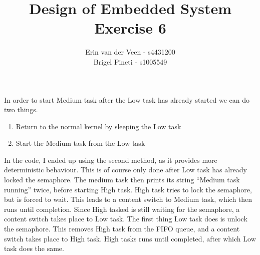 \documentclass{scrartcl}
\title{Design of Embedded System\\Exercise 6}
\author{Erin van der Veen - s4431200\\
	Brigel Pineti - s1005549}
\begin{document}
\maketitle

In order to start Medium task after the Low task has already started we can do two things.
\begin{enumerate}
	\item Return to the normal kernel by sleeping the Low task
	\item Start the Medium task from the Low task
\end{enumerate}
In the code, I ended up using the second method, as it provides more deterministic behaviour.
This is of course only done after Low task has already locked the semaphore.
The medium task then prints its string ``Medium task running'' twice, before starting High task.
High task tries to lock the semaphore, but is forced to wait.
This leads to a content switch to Medium task, which then runs until completion.
Since High tasked is still waiting for the semaphore, a content switch takes place to Low task.
The first thing Low task does is unlock the semaphore.
This removes High task from the FIFO queue, and a content switch takes place to High task.
High tasks runs until completed, after which Low task does the same.
\end{document}
